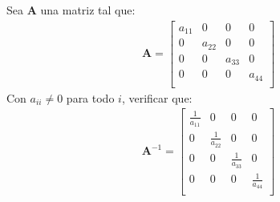 \documentclass[12pt]{article}
\newenvironment{problem}[2][Problema]{\begin{trivlist}
\item[\hskip \labelsep {\bfseries #1}\hskip \labelsep {\bfseries #2.}]}{\end{trivlist}}
\begin{document}
\begin{problem}{4}
Sea \textbf{A} una matriz tal que:
\begin{align*}
\mathbf{A}=
\begin{bmatrix}
a_{11} & 0 & 0 & 0 \\
0 & a_{22} & 0 & 0 \\
0 & 0 & a_{33} & 0 \\
0 & 0 & 0 & a_{44} \\
\end{bmatrix}
\end{align*}
Con $a_{ii}\neq 0$ para todo $i$, verificar que:
\begin{align*}
\mathbf{A}^{-1}=
\begin{bmatrix}
\frac{1}{a_{11}} & 0 & 0 & 0 \\
0 & \frac{1}{a_{22}} & 0 & 0 \\
0 & 0 & \frac{1}{a_{33}} & 0 \\
0 & 0 & 0 & \frac{1}{a_{44}} \\
\end{bmatrix}
\end{align*}
\end{problem}
\end{document}
